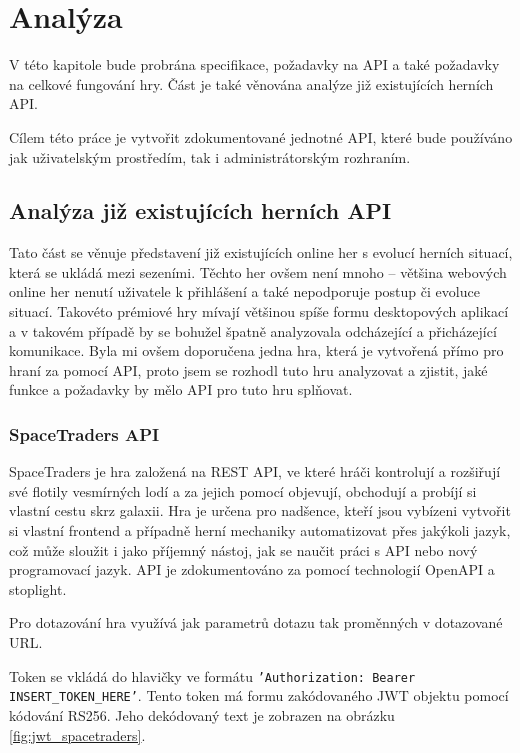 \chapter{Analýza}\label{ch:analysis}
V této kapitole bude probrána specifikace, požadavky na API a také požadavky na celkové fungování hry. Část je také věnována analýze již existujících herních API.

Cílem této práce je vytvořit zdokumentované jednotné API, které bude používáno jak uživatelským prostředím, tak i administrátorským rozhraním.

\section{Analýza již existujících herních API}\label{sec:existing_apis}

Tato část se věnuje představení již existujících online her s evolucí herních situací, která se ukládá mezi sezeními. Těchto her ovšem není mnoho -- většina webových online her nenutí uživatele k přihlášení a také nepodporuje postup či evoluce situací. Takovéto prémiové hry mívají většinou spíše formu desktopových aplikací a v takovém případě by se bohužel špatně analyzovala odcházející a přicházející komunikace.
Byla mi ovšem doporučena jedna hra, která je vytvořená přímo pro hraní za pomocí API, proto jsem se rozhodl tuto hru analyzovat a zjistit, jaké funkce a požadavky by mělo API pro tuto hru splňovat.

\subsection{SpaceTraders API}\label{sub:SpaceTraders}
SpaceTraders je hra založená na REST API, ve které hráči kontrolují a rozšiřují své flotily vesmírných lodí a za jejich pomocí objevují, obchodují a probíjí si vlastní cestu skrz galaxii. Hra je určena pro nadšence, kteří jsou vybízeni vytvořit si vlastní frontend a případně herní mechaniky automatizovat přes jakýkoli jazyk, což může sloužit i jako příjemný nástoj, jak se naučit práci s API nebo nový programovací jazyk. API je zdokumentováno za pomocí technologií OpenAPI a \gls{stoplight}. \cite[]{spacetraders}

Pro dotazování hra využívá jak parametrů dotazu tak proměnných v dotazované URL\@.

Token se vkládá do hlavičky ve formátu \texttt{'Authorization: Bearer INSERT\_TOKEN\_HERE'}. Tento token má formu zakódovaného JWT  objektu pomocí kódování RS256.
Jeho dekódovaný text je zobrazen na obrázku \ref{fig:jwt_spacetraders}.

